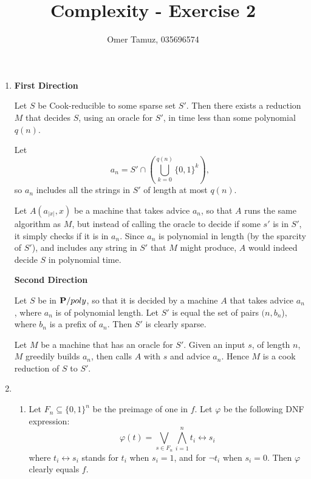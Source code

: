 \documentclass[11pt]{article} \usepackage{amssymb}
\renewcommand{\phi}{\varphi}
\begin{document}
\title{Complexity - Exercise 2}

 \author{Omer Tamuz, 035696574}
\maketitle


\begin{enumerate}
  \item
    {\bf First Direction}
    
    Let $S$ be Cook-reducible to some sparse set $S'$. Then there exists
    a reduction $M$ that decides $S$, using an oracle for $S'$, in time
    less than some polynomial $q(n)$.

    Let 
    \begin{equation*}
    a_n=S' \cap \left(\bigcup_{k=0}^{q(n)}\{0,1\}^k\right),
    \end{equation*}
    so $a_n$ includes all the strings in $S'$ of length at most $q(n)$.

    Let $A(a_{|x|},x)$ be a machine that 
    takes advice $a_n$, so that $A$ runs the same algorithm as $M$, but
    instead of calling the oracle to decide if some $s'$ is in $S'$, it simply 
    checks if it is in $a_n$. Since $a_n$ is polynomial in length (by the
    sparcity of $S'$), and
    includes any string in $S'$ that $M$ might produce, $A$ would indeed
    decide $S$ in polynomial time.

    {\bf Second Direction}
    
    Let $S$ be in $\P/poly$, so that it is decided by a machine $A$ that takes
    advice $a_n$, where $a_n$ is of polynomial length. Let
    $S'$ is equal the set of pairs $(n, b_n$), where $b_n$ is a prefix of
    $a_n$. Then $S'$ is clearly sparse.
    
    Let $M$ be a machine that has an oracle for $S'$. Given an input $s$, 
    of length $n$, $M$ greedily builds $a_n$, then calls $A$ with $s$ and
    advice $a_n$. Hence $M$ is a cook reduction of $S$ to $S'$.
    
  \item
    
    \begin{enumerate}
    \item Let $F_n \subseteq \{0,1\}^n$ be the preimage of one in $f$. Let $\phi$ be 
      the following DNF expression:
      \begin{equation*}
        \phi(t)=\bigvee_{s\in F_n}\bigwedge_{i=1}^nt_i \leftrightarrow s_i
      \end{equation*}
      where $t_i \leftrightarrow s_i$ stands for $t_i$ when $s_i=1$, and for
      $\neg t_i$ when $s_i=0$. Then $\phi$ clearly equals $f$.


\end{enumerate}
\end{enumerate}
\end{document}
